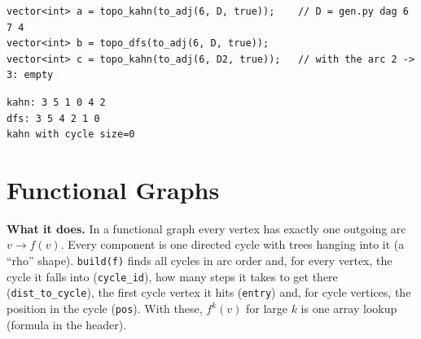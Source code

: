 \begin{diagrambox}
\end{diagrambox}

\begin{lstlisting}[style=snippet]
vector<int> a = topo_kahn(to_adj(6, D, true));    // D = gen.py dag 6 7 4
vector<int> b = topo_dfs(to_adj(6, D, true));
vector<int> c = topo_kahn(to_adj(6, D2, true));   // with the arc 2 -> 3: empty
\end{lstlisting}
\begin{lstlisting}[style=trace]
kahn: 3 5 1 0 4 2
dfs: 3 5 4 2 1 0
kahn with cycle size=0
\end{lstlisting}



\clneed
\section{Functional Graphs}
\label{sec:cl-functional}

\textbf{What it does.} In a functional graph every vertex has exactly one outgoing arc $v\to f(v)$. Every component is one directed cycle with trees hanging into it (a ``rho'' shape). \texttt{build(f)} finds all cycles in arc order and, for every vertex, the cycle it falls into (\texttt{cycle\_id}), how many steps it takes to get there (\texttt{dist\_to\_cycle}), the first cycle vertex it hits (\texttt{entry}) and, for cycle vertices, the position in the cycle (\texttt{pos}). With these, $f^{k}(v)$ for large $k$ is one array lookup (formula in the header).

